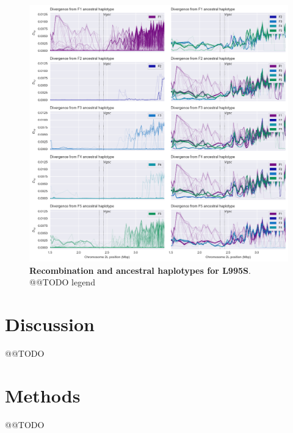 \documentclass[a4paper,11pt,abstracton]{scrartcl}
\begin{document}
%
\begin{figure}[!b]
  \includegraphics[width=1.1\linewidth,center]{artwork/fig_recom.png}
  \caption{\textbf{Recombination and ancestral haplotypes for L995S}. @@TODO legend}
  \label{fig:recom_s}
\end{figure}


\section*{Discussion}

@@TODO


\section*{Methods}

@@TODO

\printbibliography
\end{document}
